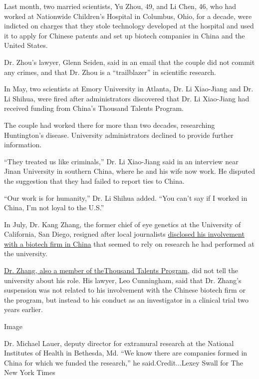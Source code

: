 Last month, two married scientists, Yu Zhou, 49, and Li Chen, 46, who
had worked at Nationwide Children's Hospital in Columbus, Ohio, for a
decade, were indicted on charges that they stole technology developed at
the hospital and used it to apply for Chinese patents and set up biotech
companies in China and the United States.

Dr. Zhou's lawyer, Glenn Seiden, said in an email that the couple did
not commit any crimes, and that Dr. Zhou is a ``trailblazer'' in
scientific research.

In May, two scientists at Emory University in Atlanta, Dr. Li Xiao-Jiang
and Dr. Li Shihua, were fired after administrators discovered that Dr.
Li Xiao-Jiang had received funding from China's Thousand Talents
Program.

The couple had worked there for more than two decades, researching
Huntington's disease. University administrators declined to provide
further information.

``They treated us like criminals,'' Dr. Li Xiao-Jiang said in an
interview near Jinan University in southern China, where he and his wife
now work. He disputed the suggestion that they had failed to report ties
to China.

``Our work is for humanity,'' Dr. Li Shihua added. ``You can't say if I
worked in China, I'm not loyal to the U.S.''

In July, Dr. Kang Zhang, the former chief of eye genetics at the
University of California, San Diego, resigned after local journalists
\href{https://inewsource.org/2019/07/06/thousand-talents-program-china-fbi-kang-zhang-ucsd/}{disclosed
his involvement with a biotech firm in China} that seemed to rely on
research he had performed at the university.

\href{https://inewsource.org/2019/07/06/thousand-talents-program-china-fbi-kang-zhang-ucsd/}{Dr.
Zhang, also a member of
the}\href{https://inewsource.org/2019/07/06/thousand-talents-program-china-fbi-kang-zhang-ucsd/}{Thousand
Talents Program}, did not tell the university about his role. His
lawyer, Leo Cunningham, said that Dr. Zhang's suspension was not related
to his involvement with the Chinese biotech firm or the program, but
instead to his conduct as an investigator in a clinical trial two years
earlier.

Image

Dr. Michael Lauer, deputy director for extramural research at the
National Institutes of Health in Bethesda, Md. ``We know there are
companies formed in China for which we funded the research,'' he
said.Credit...Lexey Swall for The New York Times

